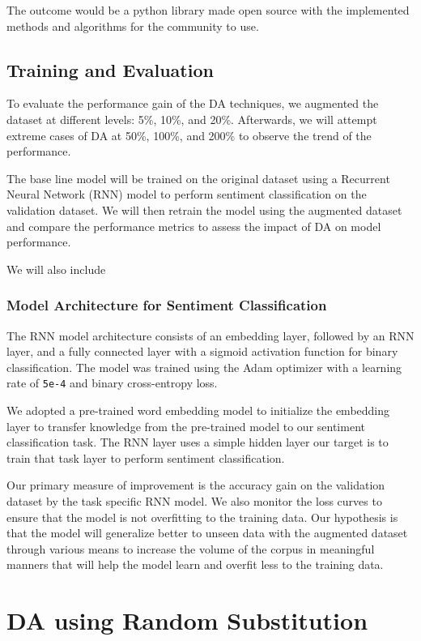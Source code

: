 \documentclass{article}
\newcommand{\code}[1]{\texttt{#1}}
\begin{document}
The outcome would be a python library made open source with the implemented
methods and algorithms for the community to use.

\subsection{Training and Evaluation}

To evaluate the performance gain of the DA techniques, we augmented the dataset
at different levels: 5\%, 10\%, and 20\%. Afterwards, we will attempt extreme
cases of DA at 50\%, 100\%, and 200\% to observe the trend of the performance.

The base line model will be trained on the original dataset using a Recurrent
Neural Network (RNN) model to perform sentiment classification on the
validation dataset. We will then retrain the model using the augmented dataset
and compare the performance metrics to assess the impact of DA on model
performance.

We will also include

\subsubsection{Model Architecture for Sentiment Classification}

The RNN model architecture consists of an embedding layer, followed by an RNN
layer, and a fully connected layer with a sigmoid activation function for
binary classification. The model was trained using the Adam optimizer with a
learning rate of \code{5e-4} and binary cross-entropy loss.

We adopted a pre-trained word embedding model to initialize the embedding layer
to transfer knowledge from the pre-trained model to our sentiment
classification task. The RNN layer uses a simple hidden layer our target is to
train that task layer to perform sentiment classification.

Our primary measure of improvement is the accuracy gain on the validation
dataset by the task specific RNN model. We also monitor the loss curves to
ensure that the model is not overfitting to the training data. Our hypothesis
is that the model will generalize better to unseen data with the augmented
dataset through various means to increase the volume of the corpus in
meaningful manners that will help the model learn and overfit less to the
training data.

\section{DA using Random Substitution}
\end{document}
